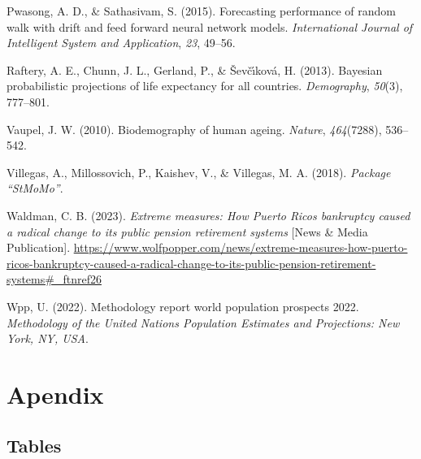 \documentclass[
  12pt,
]{report}
\newlength{\cslhangindent}
\newenvironment{CSLReferences}[2] %
 {\begin{list}{}{%
  \setlength{\itemindent}{0pt}
  \setlength{\leftmargin}{0pt}
  \setlength{\parsep}{0pt}
  \ifodd #1
   \setlength{\leftmargin}{\cslhangindent}
   \setlength{\itemindent}{-1\cslhangindent}
  \fi
  \setlength{\itemsep}{#2\baselineskip}}}
 {\end{list}}
\begin{document}
\begin{CSLReferences}{1}{0}
Pwasong, A. D., \& Sathasivam, S. (2015). Forecasting performance of
random walk with drift and feed forward neural network models.
\emph{International Journal of Intelligent System and Application},
\emph{23}, 49--56.

Raftery, A. E., Chunn, J. L., Gerland, P., \& Ševčı́ková, H. (2013).
Bayesian probabilistic projections of life expectancy for all countries.
\emph{Demography}, \emph{50}(3), 777--801.

Vaupel, J. W. (2010). Biodemography of human ageing. \emph{Nature},
\emph{464}(7288), 536--542.

Villegas, A., Millossovich, P., Kaishev, V., \& Villegas, M. A. (2018).
\emph{Package {``StMoMo''}}.

Waldman, C. B. (2023). \emph{Extreme measures: How {Puerto} {Ricos}
bankruptcy caused a radical change to its public pension retirement
systems} {[}News \& Media Publication{]}.
\url{https://www.wolfpopper.com/news/extreme-measures-how-puerto-ricos-bankruptcy-caused-a-radical-change-to-its-public-pension-retirement-systems\#_ftnref26}

Wpp, U. (2022). Methodology report world population prospects 2022.
\emph{Methodology of the United Nations Population Estimates and
Projections: New York, NY, USA}.

\end{CSLReferences}

\newpage

\chapter{Apendix}\label{apendix}

\section{Tables}\label{tables}
\end{document}
